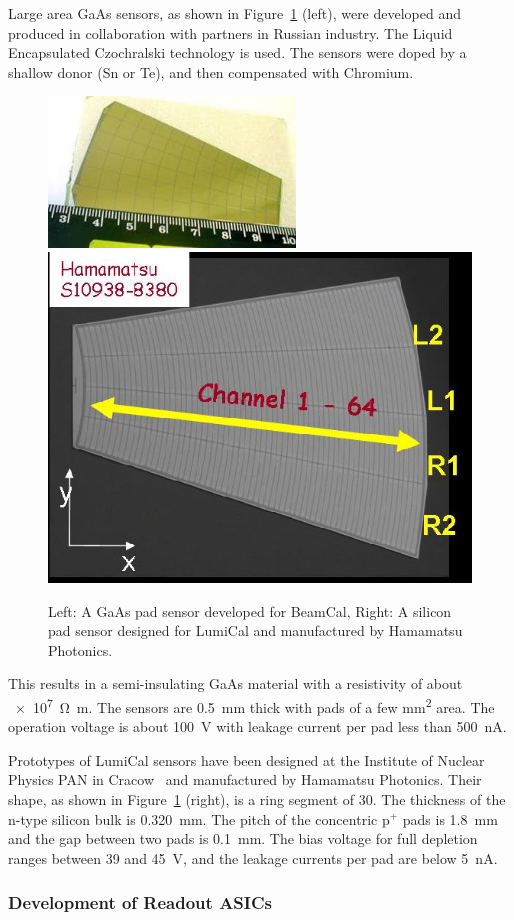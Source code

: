 Large area GaAs sensors, as shown in Figure~\ref{fig:GaAs} (left), were developed
and produced in collaboration with partners in Russian industry. The Liquid Encapsulated
Czochralski technology is used. The sensors were
doped by a shallow donor (Sn or Te),
and then compensated  with Chromium.
\begin{figure}
\centering
    \includegraphics[width=0.4\columnwidth, height=4cm]{Calorimeter/FCAL/figs/GaAs_sensor_new.jpg}
    \hspace{1cm}
     \includegraphics[width=0.4\columnwidth]{Calorimeter/FCAL/figs/si_proto.jpg}
          \caption{Left: A GaAs pad sensor developed for BeamCal, Right: A silicon pad sensor designed for LumiCal and manufactured by Hamamatsu Photonics.}
    \label{fig:GaAs}
\end{figure}
This results in a semi-insulating GaAs material with a resistivity of about \SI{e7}{\ohm \meter}.
The sensors are \SI{0.5}{mm} thick with pads of a few \si{\milli\meter\squared} area. The operation voltage is about \SI{100}{V} with
leakage current per pad less than \SI{500}{nA}.

Prototypes of LumiCal sensors have been designed
at the Institute of Nuclear Physics PAN
in Cracow~\cite{EUDETMEMO-2009-07} 
and manufactured by Hamamatsu
Photonics.
Their shape, as shown in Figure~\ref{fig:GaAs} (right), is a ring segment of 30\textdegree.
The thickness of the n-type silicon bulk is \SI{0.320}{mm}.
The pitch of the concentric p$^+$ pads is \SI{1.8}{mm} and
the gap between two pads is \SI{0.1}{mm}.
The bias voltage for full depletion ranges between 39 and \SI{45}{V},
and the leakage currents per pad are below \SI{5}{nA}.

\subsubsection{Development of Readout ASICs}

